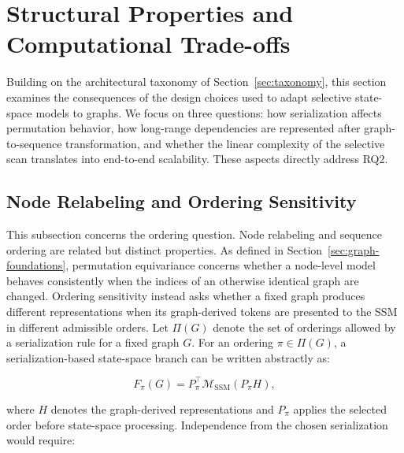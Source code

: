 \documentclass[acmsmall]{acmart}
\begin{document}
\section{Structural Properties and Computational Trade-offs}
\label{sec:structural-properties}

Building on the architectural taxonomy of Section~\ref{sec:taxonomy}, this
section examines the consequences of the design choices used to adapt selective
state-space models to graphs. We focus on three questions: how serialization affects permutation behavior,
how long-range dependencies are represented after graph-to-sequence
transformation, and whether the linear complexity of the selective scan
translates into end-to-end scalability. These aspects directly address RQ2.

\subsection{Node Relabeling and Ordering Sensitivity}
\label{subsec:order-sensitivity}

This subsection concerns the ordering question. Node relabeling and sequence ordering are related but distinct properties.
As defined in Section~\ref{sec:graph-foundations}, permutation equivariance
concerns whether a node-level model behaves consistently when the indices of
an otherwise identical graph are changed. Ordering sensitivity instead asks
whether a fixed graph produces different representations when its
graph-derived tokens are presented to the SSM in different admissible orders.
Let $\Pi(G)$ denote the set of orderings allowed by a serialization rule for a
fixed graph $G$. For an ordering $\pi\in\Pi(G)$, a serialization-based
state-space branch can be written abstractly as:

\begin{equation}
F_{\pi}(G)
=
P_{\pi}^{\top}
\mathcal{M}_{\mathrm{SSM}}
\left(P_{\pi}H\right),
\label{eq:order-output}
\end{equation}

where $H$ denotes the graph-derived representations and $P_{\pi}$ applies the
selected order before state-space processing. Independence from the chosen
serialization would require:
\end{document}
